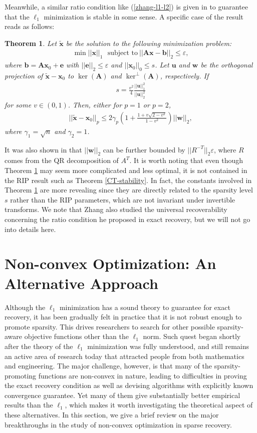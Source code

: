 \documentclass[11pt]{article}
\numberwithin{equation}{section}
\theoremstyle{plain}
\newtheorem{Th}{Theorem}[section]
\theoremstyle{definition}
\def\A{{\mathbf A}}
\def\x{{\mathbf x}}
\def\b{{\mathbf b}}
\def\e{{\varepsilon}}
\def\u{{\mathbf{u}}}
\def\w{{\mathbf{w}}}
\begin{document}
Meanwhile, a similar ratio condition like (\ref{zhang-l1-l2}) is given in \cite{zhang2013theory} to guarantee that the $\ell_1$ minimization is stable in some sense. A specific case of the result reads as follows:
\begin{Th}\label{zhang-stability}
Let $\tilde{\x}$ be the solution to the following minimization problem:
\begin{align*}
\min ||\x||_1 \ \ \ \text{subject to}\ ||\A\x-\b||_2\leq\e,
\end{align*}
where $\b = \A\x_0+\mathbf{e}$ with $||\mathbf{e}||_2\leq\e$ and $||\x_0||_0\leq s$. Let $\u$ and $\w$ be the orthogonal projection of $\tilde{\x}-\x_0$ to $\ker(\A)$ and $\ker^\perp(\A)$, respectively. If 
\begin{align*}
s=\frac{v^2}{4}\frac{||\u||_1^2}{||\u||_2^2}
\end{align*}
for some $v\in (0, 1)$. Then, either for $p=1$ or $p=2$,
\begin{align*}
||\tilde{\x}-\x_0||_p\leq 2\gamma_p\left(1+\frac{1+v\sqrt{2-v^2}}{1-v^2}\right)||\w||_2, 
\end{align*}
where $\gamma_1=\sqrt{n}$ and $\gamma_2=1$. 
\end{Th}
It was also shown in \cite{zhang2013theory} that $||\w||_2$ can be further bounded by $||R^{-T}||_2\e$, where $R$ comes from the QR decomposition of $A^T$. It is worth noting that even though Theorem \ref{zhang-stability} may seem more complicated and less optimal, it is not contained in the RIP result such as Theorem \ref{CT-stability}. In fact, the constants involved in Theorem \ref{zhang-stability} are more revealing since they are directly related to the sparsity level $s$ rather than the RIP parameters, which are not invariant under invertible transforms. We note that Zhang also studied the universal recoverability concerning the ratio condition he proposed in exact recovery, but we will not go into details here.    



\section{Non-convex Optimization: An Alternative Approach}


Although the $\ell_1$ minimization has a sound theory to guarantee for exact recovery, it has been gradually felt in practice that it is not robust enough to promote sparsity. This drives researchers to search for other possible sparsity-aware objective functions other than the $\ell_1$ norm. Such quest began shortly after the theory of the $\ell_1$ minimization was fully understood, and still remains an active area of research today that attracted people from both mathematics and engineering. The major challenge, however, is that many of the sparsity-promoting functions are non-convex in nature, leading to difficulties in proving the exact recovery condition as well as devising algorithms with explicitly known convergence guarantee. Yet many of them give substantially better empirical results than the $\ell_1$, which makes it worth investigating the theoretical aspect of these alternatives. In this section, we give a brief review on the major breakthroughs in the study of non-convex optimization in sparse recovery. 
\end{document}
